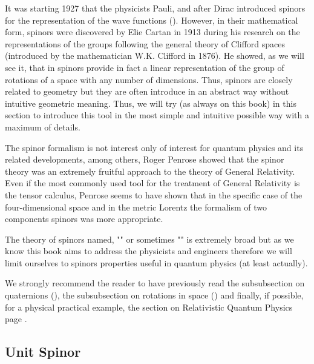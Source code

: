 	It was starting 1927 that the physicists Pauli, and after Dirac introduced spinors  for the representation of the wave functions (). However, in their mathematical form, spinors were discovered by Elie Cartan in 1913 during his research on the representations of the groups following the general theory of Clifford spaces (introduced by the mathematician W.K. Clifford in 1876). He showed, as we will see it, that in spinors provide in fact a linear representation of the group of rotations of a space with any number of dimensions. Thus, spinors are closely related to geometry but they are often introduce in an abstract way without intuitive geometric meaning. Thus, we will try (as always on this book) in this section to introduce this tool in the most simple and intuitive possible way with a maximum of details.
	
	The spinor formalism is not interest only of interest for quantum physics and its related developments, among others, Roger Penrose showed that the spinor theory was an extremely fruitful approach to the theory of General Relativity. Even if the most commonly used tool for the treatment of General Relativity is the tensor calculus, Penrose seems to have shown that in the specific case of the four-dimensional space and in the metric Lorentz the formalism of two components spinors was more appropriate.
	
	The theory of spinors named, "" or sometimes "" is extremely broad but as we know this book aims to address the physicists and engineers therefore we will limit ourselves to spinors properties useful in quantum physics (at least actually).
	
	\begin{tcolorbox}[title=Remark,colframe=black,arc=10pt]
We strongly recommend the reader to have previously read the subsubsection on quaternions (), the subsubsection on rotations in space () and finally, if possible, for a physical practical example, the section on Relativistic Quantum Physics page \pageref{relativistic quantum physics}.
	\end{tcolorbox}
	
	\pagebreak
	\subsection{Unit Spinor}
	
